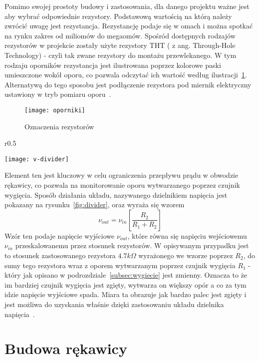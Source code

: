 	Pomimo swojej prostoty budowy i zastosowania, dla danego projektu ważne jest aby wybrać odpowiednie rezystory. Podstawową wartością na którą należy zwrócić uwagę jest rezystancja. Rezystancję podaje się w omach i można spotkać na rynku zakres od miliomów do megaomów. Spośród dostępnych rodzajów rezystorów w projekcie zostały użyte rezystory THT ( z ang. Through-Hole Technology) - czyli tak zwane rezystory do montażu przewlekanego. W tym rodzaju oporników rezystancja jest ilustrowana poprzez kolorowe paski umieszczone wokół oporu, co pozwala odczytać ich wartość według ilustracji~\ref{fig:oporniki}. Alternatywą do tego sposobu jest podłączenie rezystora pod miernik elektryczny ustawiony w tryb pomiaru oporu~\cite{rezystor}. 
		
\begin{figure}[h]
\centering
\texttt{[image: oporniki]}
\caption{Oznaczenia rezystorów}
\label{fig:oporniki}
\end{figure}
	
\begin{wrapfigure}{r}{0.5\textwidth}
\begin{center}
\texttt{[image: v-divider]}
\caption{Układ dzielnika napięcia}
\label{fig:divider}
\end{center}
\end{wrapfigure}

	Element ten jest kluczowy w celu ograniczenia przepływu prądu w obwodzie rękawicy, co pozwala na monitorowanie oporu wytwarzanego poprzez czujnik wygięcia. Sposób działania układu, nazywanego dzielnikiem napięcia jest pokazany na rysunku~\ref{fig:divider}, oraz wyraża się wzorem
	$$
		\nu_{out} = \nu_{in}\left[ \frac{R_2}{R_1+R_2}\right]
	$$
Wzór ten podaje napięcie wyjściowe $\nu_{out}$, które równa się napięciu wejściowemu $\nu_{in}$ przeskalowanemu przez stosunek rezystorów. W opisywanym przypadku jest to stosunek zastosowanego rezystora $4.7 k\Omega$ wyrażonego we wzorze poprzez $R_2$, do sumy tego rezystora wraz z oporem wytwarzanym poprzez czujnik wygięcia $R_1$ - który jak opisano w podrozdziale~\ref{subsec:wygiecie} jest zmienny. Oznacza to że im bardziej czujnik wygięcia jest zgięty, wytwarza on większy opór a co za tym idzie napięcie wyjściowe spada. Miara ta obrazuje jak bardzo palec jest zgięty i jest możliwa do uzyskania właśnie dzięki zastosowaniu układu dzielnika napięcia~\cite{v-divider}.


\section{Budowa rękawicy}
\label{sec:budowa}

